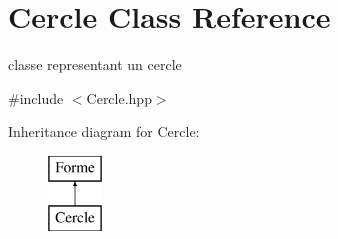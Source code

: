 \hypertarget{class_cercle}{}\section{Cercle Class Reference}
\label{class_cercle}


classe representant un cercle  




{\ttfamily \#include $<$Cercle.\+hpp$>$}

Inheritance diagram for Cercle\+:\begin{figure}[H]
\begin{center}
\leavevmode
\includegraphics[height=2.000000cm]{class_cercle}
\end{center}
\end{figure}
